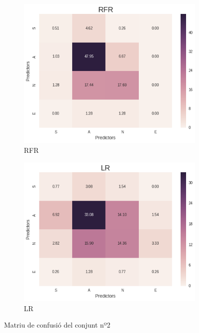 \documentclass[12pt,a4paper,catalan]{article}
\begin{document}
\begin{figure}[h]
\centering
\begin{subfigure}{.4\textwidth}
  \centering
  \includegraphics[width=\linewidth]{img/heatmap_rfr_primersegon_tercer.png}
  \caption{RFR}
\end{subfigure}
\begin{subfigure}{.4\textwidth}
  \centering
  \includegraphics[width=\linewidth]{img/heatmap_lr_primersegon_tercer.png}
  \caption{LR}
\end{subfigure}
\caption{Matriu de confusió del conjunt nº2}
\label{fig:mctps}
\end{figure}
\end{document}
